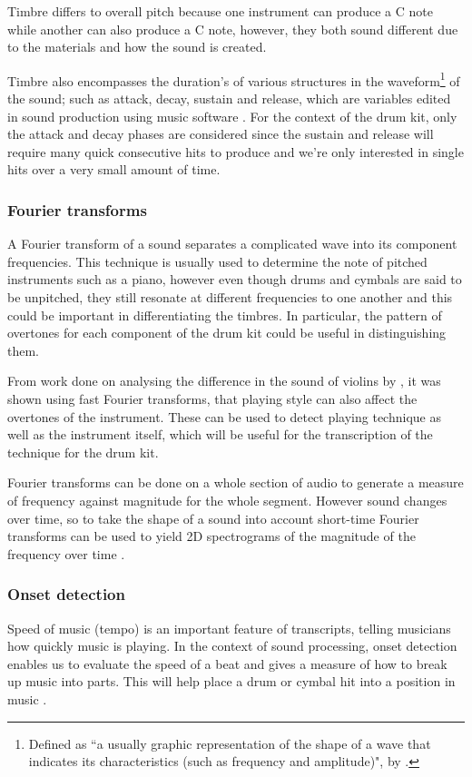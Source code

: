 \documentclass[12pt]{article}
\begin{document}
	Timbre differs to overall pitch because one instrument can produce a C note while another can also produce a C note, however, they both sound different due to the materials and how the sound is created.\medskip
	
	Timbre also encompasses the duration's of various structures in the waveform\footnote{Defined as ``a usually graphic representation of the shape of a wave that indicates its characteristics (such as frequency and amplitude)", by \textcite{merriam-webster}.} of the sound; such as attack, decay, sustain and release, which are variables edited in sound production using music software \parencite[p.26-29]{Muller}. For the context of the drum kit, only the attack and decay phases are considered since the sustain and release will require many quick consecutive hits to produce and we're only interested in single hits over a very small amount of time.\medskip
	
	\subsubsection{Fourier transforms}
	\label{sec:fourier_transforms}
	A Fourier transform of a sound separates a complicated wave into its component frequencies. This technique is usually used to determine the note of pitched instruments such as a piano, however even though drums and cymbals are said to be unpitched, they still resonate at different frequencies to one another and this could be important in differentiating the timbres. In particular, the pattern of overtones for each component of the drum kit could be useful in distinguishing them.\medskip
	
	From work done on analysing the difference in the sound of violins by \textcite{Yokoyama2016}, it was shown using fast Fourier transforms, that playing style can also affect the overtones of the instrument. These can be used to detect playing technique as well as the instrument itself, which will be useful for the transcription of the technique for the drum kit.\medskip
	
	Fourier transforms can be done on a whole section of audio to generate a measure of frequency against magnitude for the whole segment. However sound changes over time, so to take the shape of a sound into account short-time Fourier transforms can be used to yield 2D spectrograms of the magnitude of the frequency over time \parencite[p.53]{Muller}.\medskip
	
	\subsubsection{Onset detection}
	\label{sec:onset_detection}
	Speed of music (tempo) is an important feature of transcripts, telling musicians how quickly music is playing. In the context of sound processing, onset detection enables us to evaluate the speed of a beat and gives a measure of how to break up music into parts. This will help place a drum or cymbal hit into a position in music \parencite[p.304]{Muller}.\medskip
	
\end{document}
